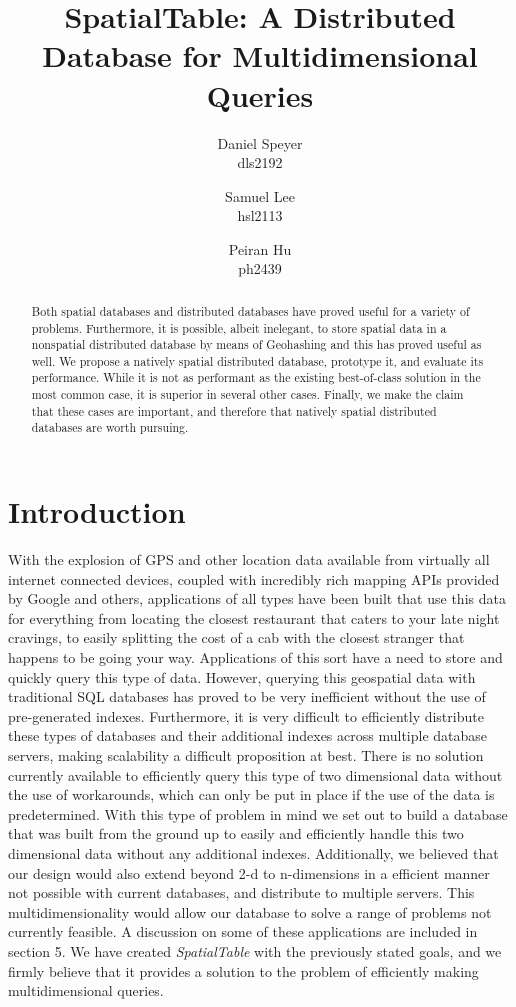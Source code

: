 \documentclass[11pt]{article}
\begin{document}
\author{Daniel Speyer\\dls2192 \and Samuel Lee\\hsl2113 \and Peiran Hu\\ph2439}
\title{SpatialTable: A Distributed Database for Multidimensional Queries}



\maketitle

\begin{abstract}
Both spatial databases and distributed databases have proved useful for a variety of problems.  Furthermore, it is possible, albeit inelegant, to store spatial data in a nonspatial distributed database by means of Geohashing and this has proved useful as well.  We propose a natively spatial distributed database, prototype it, and evaluate its performance.  While it is not as performant as the existing best-of-class solution in the most common case, it is superior in several other cases.  Finally, we make the claim that these cases are important, and therefore that natively spatial distributed databases are worth pursuing.
\end{abstract}

\section{Introduction}
With the explosion of GPS and other location data available from virtually all internet connected devices, coupled with incredibly rich mapping APIs provided by Google and others, applications of all types have been built that use this data for everything from locating the closest restaurant that caters to your late night cravings, to easily splitting the cost of a cab with the closest stranger that happens to be going your way. Applications of this sort have a need to store and quickly query this type of data. However, querying this geospatial data with traditional SQL databases has proved to be very inefficient without the use of pre-generated indexes. Furthermore, it is very difficult to efficiently distribute these types of databases and their additional indexes across multiple database servers, making scalability a difficult proposition at best. There is no solution currently available to efficiently query this type of two dimensional data without the use of workarounds, which can only be put in place if the use of the data is predetermined. With this type of problem in mind we set out to build a database that was built from the ground up to easily and efficiently handle this two dimensional data without any additional indexes. Additionally, we believed that our design would also extend beyond 2-d to n-dimensions in a efficient manner not possible with current databases, and distribute to multiple servers. This multidimensionality would allow our database to solve a range of problems not currently feasible. A discussion on some of these applications are included in section 5. We have created \textit{SpatialTable} with the previously stated goals, and we firmly believe that it provides a solution to the problem of efficiently making multidimensional queries.
\end{document}
